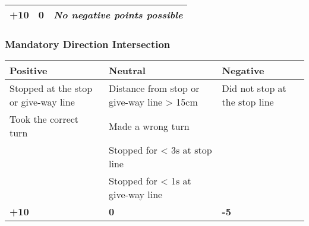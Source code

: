 {\begin{highlight}
\begin{table}[H]
\begin{tabularx}{\textwidth}{XXX}
				\topstrut
				\textbf{+10}                           & \textbf{0}                         & \textit{No negative points possible} \\
				\bottomrule
			\end{tabularx}
		\end{table}

		\subsubsection*{Mandatory Direction Intersection}
		\begin{table}[H]
			\begin{tabularx}{\textwidth}{XXX}
				\toprule
				\textbf{Positive}                    & \textbf{Neutral}                           & \textbf{Negative}                              \\
				\midrule
				Stopped at the stop or give-way line & Distance from stop or give-way line > 15cm & Did not stop at the stop line \footnotemark[3] \\
				Took the correct turn                & Made a wrong turn \footnotemark[4]         &                                                \\
				                                     & Stopped for < 3s at stop line              &                                                \\
				                                     & Stopped for < 1s at give-way line          &                                                \\
				\topstrut
				\textbf{+10}                         & \textbf{0}                                 & \textbf{-5}                                    \\
				\bottomrule
			\end{tabularx}
		\end{table}

		\newpage


\end{highlight}}
